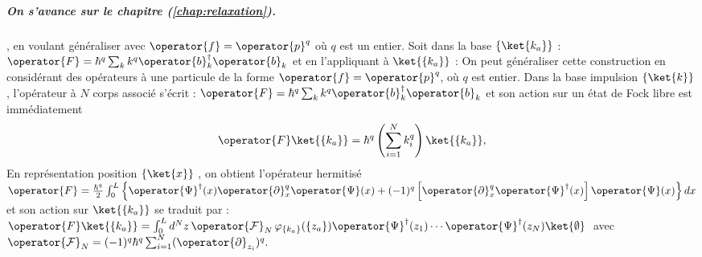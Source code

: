 \begin{mdframed}[
	linewidth=0.5pt, 
	backgroundcolor=gray!5, 
	roundcorner=50pt,	
	innerleftmargin=5pt,
    innerrightmargin=5pt,
    innertopmargin=-10pt,
    innerbottommargin=2pt,
    leftmargin=2pt,
    rightmargin=2pt
	]
\subparagraph{On s'avance sur le chapitre (\ref{chap:relaxation}).} , en voulant généraliser avec $\operator{f} = \operator{p}^q$ où $q$ est un entier. Soit dans la base \(\{\ket{k_a}\}\) : \(\operator{F} = \hbar^q \sum_k k^q \operator{b}_k^\dagger \operator{b}_k^{} \) et en l'appliquant à \(\ket{\{k_a\}}\) :
On peut généraliser cette construction en considérant des opérateurs à une particule de la forme $\operator{f} = \operator{p}^q$, où $q$ est entier. Dans la base impulsion \(\{\ket{k}\}\), l’opérateur à $N$ corps associé s’écrit : \(\operator{F} = \hbar^q \sum_k k^q \operator{b}_k^\dagger \operator{b}_k^{} \) et son action sur un état de Fock libre est immédiatement 
\begin{eqnarray}\label{chap.1:eq.rapel.opp.1.second.3}
	 \operator{F} \ket{\{k_a\}} = \hbar^q \left( \sum_{i = 1}^N k_i^q \right) \ket{\{k_a\}},
\end{eqnarray}
En représentation position \(\{\ket{x}\}\) , on obtient l’opérateur hermitisé \\	
\(
	\operator{F}  =  \frac{\hbar^q}2 \int_0^L \left \{  \operator{\Psi}^\dag(x) \operator{\partial}_x^q \operator{\Psi}(x) + (-1)^q \left [\operator{\partial}_x^q \operator{\Psi}^\dag(x)\right ]\operator{\Psi}(x)\right \} dx
\)
et son action sur $\ket{\{k_a\}}$ se traduit par :\\ 
\(
	\operator{F}\ket{ \{k_a\}} =  \int_0^L d^N z \, \operator{\mathcal{F}}_N \, \varphi_{\{k_a\}}(\{z_a\} ) \operator{\Psi}^\dag(z_1) \cdots \operator{\Psi}^\dag(z_N) \ket{\emptyset}\, 
\) \mbox{avec} 
\(\operator{\mathcal{F}}_N = (-1)^q\hbar^q \sum_{i=1}^N (\operator{\partial}_{z_i})^q.
\)

\medskip



%
%
%


\end{mdframed}
